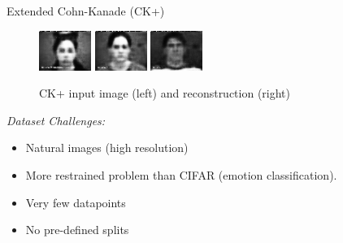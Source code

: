 \documentclass[final]{beamer}
\newlength{\onecolwid}
\newlength{\threecolwid}
\begin{document}
\begin{frame}[t]
\begin{columns}[t]
\begin{column}{\threecolwid}
\begin{columns}[T, totalwidth=\threecolwid]
\begin{column}{\onecolwid}
\begin{block}{Extended Cohn-Kanade (CK+)}
\begin{figure}
\includegraphics[width=0.3\linewidth]{graphics/reconstructions/ckplus/reconstruction_00.png}
\includegraphics[width=0.3\linewidth]{graphics/reconstructions/ckplus/reconstruction_01.png}
\includegraphics[width=0.3\linewidth]{graphics/reconstructions/ckplus/reconstruction_02.png}

\caption{CK+ input image (left) and reconstruction (right)}
\end{figure}

\emph{Dataset Challenges:}
\begin{itemize}
\item Natural images (high resolution)
\item More restrained problem than CIFAR (emotion classification).
\item Very few datapoints 
\item No pre-defined splits
\end{itemize}

\end{block}

\end{column}

\end{columns}

\begin{columns}[t, totalwidth=\threecolwid] %



\end{columns}
\end{column}
\end{columns}
\end{frame}
\end{document}
